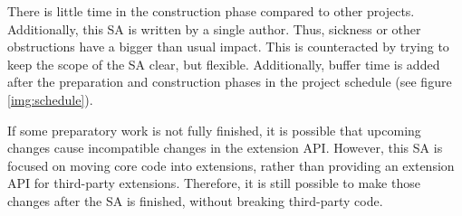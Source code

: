 There is little time in the construction phase compared to other projects.
Additionally, this SA is written by a single author. Thus, sickness or other
obstructions have a bigger than usual impact. This is counteracted by trying to
keep the scope of the SA clear, but flexible. Additionally, buffer time is
added after the preparation and construction phases in the project schedule
(see figure \ref{img:schedule}).

If some preparatory work is not fully finished, it is possible that upcoming
changes cause incompatible changes in the extension API. However, this SA
is focused on moving core code into extensions, rather than providing an
extension API for third-party extensions. Therefore, it is still possible to make
those changes after the SA is finished, without breaking third-party code.